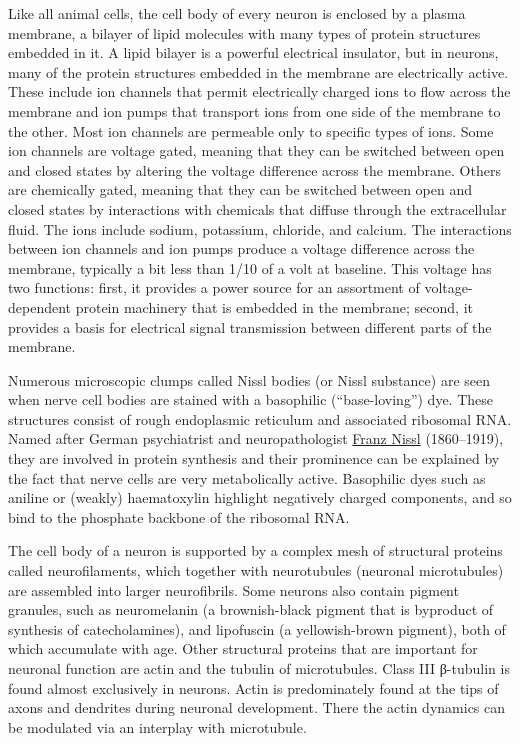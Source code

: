 Like all animal cells, the cell body of every neuron is enclosed by a plasma membrane, a bilayer of lipid molecules with many types of protein structures embedded in it. A lipid bilayer is a powerful electrical insulator, but in neurons, many of the protein structures embedded in the membrane are electrically active. These include ion channels that permit electrically charged ions to flow across the membrane and ion pumps that transport ions from one side of the membrane to the other. Most ion channels are permeable only to specific types of ions. Some ion channels are voltage gated, meaning that they can be switched between open and closed states by altering the voltage difference across the membrane. Others are chemically gated, meaning that they can be switched between open and closed states by interactions with chemicals that diffuse through the extracellular fluid. The ions include sodium, potassium, chloride, and calcium. The interactions between ion channels and ion pumps produce a voltage difference across the membrane, typically a bit less than 1/10 of a volt at baseline. This voltage has two functions: first, it provides a power source for an assortment of voltage-dependent protein machinery that is embedded in the membrane; second, it provides a basis for electrical signal transmission between different parts of the membrane.

Numerous microscopic clumps called Nissl bodies (or Nissl substance) are seen when nerve cell bodies are stained with a basophilic (``base-loving'') dye. These structures consist of rough endoplasmic reticulum and associated ribosomal RNA. Named after German psychiatrist and neuropathologist \href{https://en.wikipedia.org/wiki/Franz_Nissl}{Franz Nissl} (1860--1919), they are involved in protein synthesis and their prominence can be explained by the fact that nerve cells are very metabolically active. Basophilic dyes such as aniline or (weakly) haematoxylin highlight negatively charged components, and so bind to the phosphate backbone of the ribosomal RNA.

The cell body of a neuron is supported by a complex mesh of structural proteins called neurofilaments, which together with neurotubules (neuronal microtubules) are assembled into larger neurofibrils. Some neurons also contain pigment granules, such as neuromelanin (a brownish-black pigment that is byproduct of synthesis of catecholamines), and lipofuscin (a yellowish-brown pigment), both of which accumulate with age. Other structural proteins that are important for neuronal function are actin and the tubulin of microtubules. Class III β-tubulin is found almost exclusively in neurons. Actin is predominately found at the tips of axons and dendrites during neuronal development. There the actin dynamics can be modulated via an interplay with microtubule.



